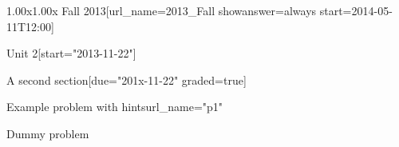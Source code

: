 \documentclass[12pt]{article}
\begin{document}
\begin{edXcourse}{1.00x}{1.00x Fall 2013}[url_name=2013_Fall showanswer=always start=2014-05-11T12:00]
\begin{edXchapter}{Unit 2}[start="2013-11-22"]
\begin{edXsection}{A second section}[due="201x-11-22" graded=true]

\begin{edXproblem}{Example problem with hints}{url_name="p1"}
 
Dummy problem

\end{edXproblem}


\end{edXsection}
\end{edXchapter}
\end{edXcourse}

\end{document}
